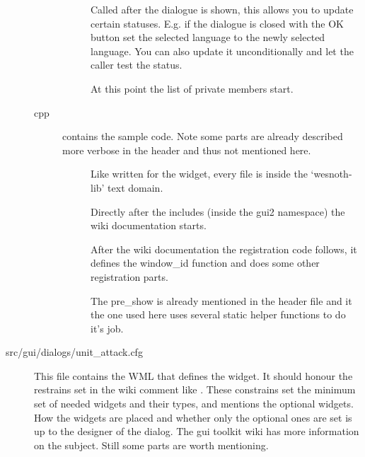\begin{description}
\begin{description}
\begin{description}
	\item[]
		Called after the dialogue is shown, this allows you to update certain
statuses. E.g. if the dialogue is closed with the OK button set the selected
language to the newly selected language. You can also update it unconditionally
and let the caller test the status.

	\item[]
		At this point the list of private members start.

	\end{description}

\item[cpp]  contains the sample code. Note some
parts are already described more verbose in the header and thus not mentioned
here.
	\begin{description}
	\item[]
		Like written for the widget, every file is inside the `wesnoth-lib' text
domain.

	\item[]
		Directly after the includes (inside the gui2 namespace) the wiki
documentation starts.


	\item[]
		After the wiki documentation the registration code follows, it defines
the window\_id function and does some other registration parts.

	\item[]
		The pre\_show is already mentioned in the header file and it the one
used here uses several static helper functions to do it's job.

	\end{description}

\end{description}

\item[src/gui/dialogs/unit\_attack.cfg]
	This file contains the WML that defines the widget. It should honour the
restrains set in the wiki comment like . These
constrains set the minimum set of needed widgets and their types, and mentions
the optional widgets. How the widgets are placed and whether only the optional
ones are set is up to the designer of the dialog. The gui toolkit wiki has more
information on the subject. Still some parts are worth mentioning.


\end{description}
